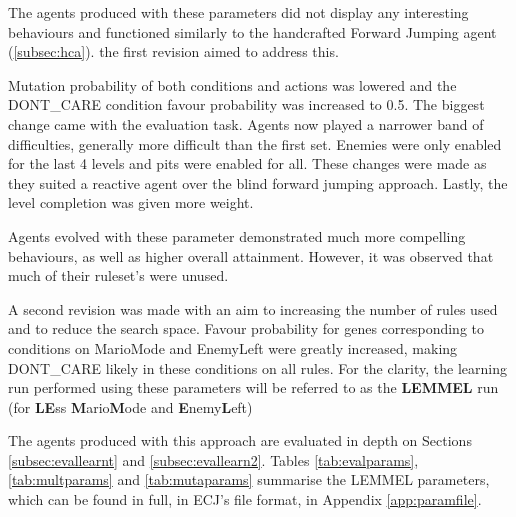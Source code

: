 The agents produced with these parameters did not display any interesting behaviours and functioned similarly to the handcrafted Forward Jumping agent (\ref{subsec:hca}). the first revision aimed to address this.

Mutation probability of both conditions and actions was lowered and the {\footnotesize DONT\_CARE} condition favour probability was increased to 0.5. The biggest change came with the evaluation task. Agents now played a narrower band of difficulties, generally more difficult than the first set. Enemies were only enabled for the last 4 levels and pits were enabled for all. These changes were made as they suited a reactive agent over the blind forward jumping approach. Lastly, the level completion was given more weight.

Agents evolved with these parameter demonstrated much more compelling behaviours, as well as higher overall attainment. However, it was observed that much of their ruleset's were unused.

A second revision was made with an aim to increasing the number of rules used and to reduce the search space. Favour probability for genes corresponding to conditions on MarioMode and EnemyLeft were greatly increased, making {\footnotesize DONT\_CARE} likely in these conditions on all rules. For the clarity, the learning run performed using these parameters will be referred to as the \textbf{LEMMEL} run (for \textbf{LE}ss \textbf{M}ario\textbf{M}ode and \textbf{E}nemy\textbf{L}eft)

The agents produced with this approach are evaluated in depth on Sections \ref{subsec:evallearnt} and \ref{subsec:evallearn2}. Tables \ref{tab:evalparams}, \ref{tab:multparams} and \ref{tab:mutaparams} summarise the LEMMEL parameters, which can be found in full, in ECJ's file format, in Appendix \ref{app:paramfile}.

